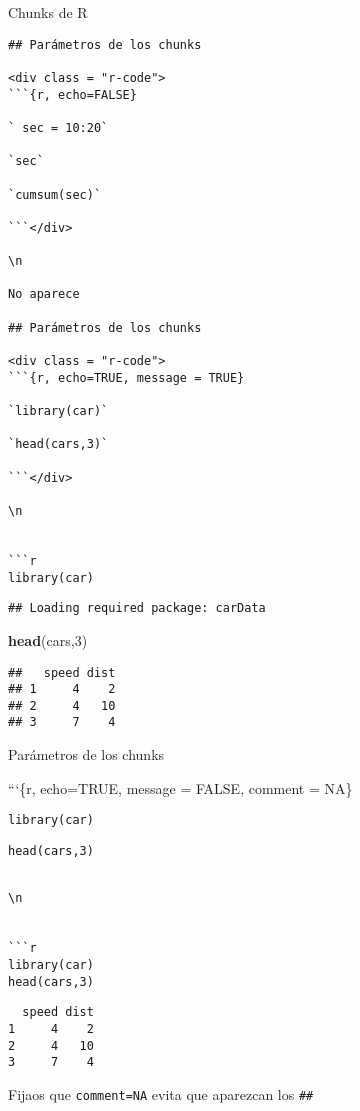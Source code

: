 \documentclass[
  ignorenonframetext,
]{beamer}
\newenvironment{Shaded}{\begin{snugshade}}{\end{snugshade}}
\newcommand{\DecValTok}[1]{\textcolor[rgb]{0.00,0.00,0.81}{#1}}
\newcommand{\KeywordTok}[1]{\textcolor[rgb]{0.13,0.29,0.53}{\textbf{#1}}}
\newcommand{\NormalTok}[1]{#1}
\begin{document}
\begin{frame}[fragile]{Chunks de R}
\begin{verbatim}
## Parámetros de los chunks

<div class = "r-code">
```{r, echo=FALSE}

` sec = 10:20`

`sec`

`cumsum(sec)`

```</div>

\n

No aparece

## Parámetros de los chunks

<div class = "r-code">
```{r, echo=TRUE, message = TRUE}

`library(car)`

`head(cars,3)`

```</div>

\n


```r
library(car)
\end{verbatim}

\begin{verbatim}
## Loading required package: carData
\end{verbatim}

\begin{Shaded}
\begin{Highlighting}[]
\KeywordTok{head}\NormalTok{(cars,}\DecValTok{3}\NormalTok{)}
\end{Highlighting}
\end{Shaded}

\begin{verbatim}
##   speed dist
## 1     4    2
## 2     4   10
## 3     7    4
\end{verbatim}

\end{frame}

\begin{frame}[fragile]{Parámetros de los chunks}
\protect\hypertarget{paruxe1metros-de-los-chunks}{}

```\{r, echo=TRUE, message = FALSE, comment = NA\}

\texttt{library(car)}

\texttt{head(cars,3)}

\begin{verbatim}

\n


```r
library(car)
head(cars,3)
\end{verbatim}

\begin{verbatim}
  speed dist
1     4    2
2     4   10
3     7    4
\end{verbatim}

Fijaos que \texttt{comment=NA} evita que aparezcan los \texttt{\#\#}

\end{frame}
\end{document}
